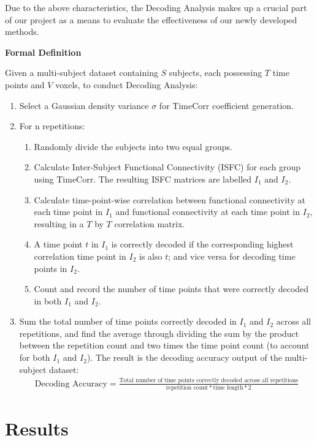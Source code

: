\documentclass[11pt]{article}
\begin{document}
Due to the above characteristics, the Decoding Analysis makes up a crucial part of our project as a means to evaluate the effectiveness of our newly developed methods.

\large{\textbf{Formal Definition}}

\normalsize
Given a multi-subject dataset containing $S$ subjects, each possessing $T$ time points and $V$ voxels, to conduct Decoding Analysis:
\begin{enumerate}
\item Select a Gaussian density variance $\sigma$ for TimeCorr coefficient generation.
\item For n repetitions:
\begin{enumerate}
\item Randomly divide the subjects into two equal groups.
\item Calculate Inter-Subject Functional Connectivity (ISFC) for each group using TimeCorr. The resulting ISFC matrices are labelled $I_1$ and $I_2$.
\item Calculate time-point-wise correlation between functional connectivity at each time point in $I_1$ and functional connectivity at each time point in $I_2$, resulting in a $T$ by $T$ correlation matrix.
\item A time point $t$ in $I_1$ is correctly decoded if the corresponding highest correlation time point in $I_2$ is also $t$; and vice versa for decoding time points in $I_2$.
\item Count and record the number of time points that were correctly decoded in both $I_1$ and $I_2$.
\end{enumerate}
\item Sum the total number of time points correctly decoded in $I_1$ and $I_2$ across all repetitions, and find the average through dividing the sum by the product between the repetition count and two times the time point count (to account for both $I_1$ and $I_2$). The result is the decoding accuracy output of the multi-subject dataset:
\begin{align*}
\text{Decoding Accuracy} = \frac{\text{Total number of time points correctly decoded across all repetitions}}{\text{repetition count} * \text{time length} * 2}
\end{align*}
\end{enumerate}

\newpage
\section{Results}
\end{document}
